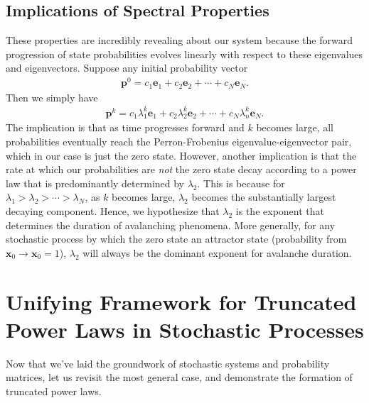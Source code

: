 \documentclass[superscriptaddress]{revtex4-1}
\begin{document}
\subsection{Implications of Spectral Properties}
These properties are incredibly revealing about our system because the forward progression of state probabilities evolves linearly with respect to these eigenvalues and eigenvectors. Suppose any initial probability vector
\begin{align*}
\bm{p}^0 = 
c_1 \bm{e}_1 + c_2 \bm{e}_2 + \dotsm + c_N \bm{e}_N.
\end{align*}
Then we simply have
\begin{align*}
\bm{p}^k = c_1\lambda_1^k\bm{e}_1 + c_2\lambda_2^k\bm{e}_2 + \dotsm + c_N\lambda_n^k\bm{e}_N.
\end{align*}
The implication is that as time progresses forward and $k$ becomes large, all probabilities eventually reach the Perron-Frobenius eigenvalue-eigenvector pair, which in our case is just the zero state. However, another implication is that the rate at which our probabilities are \emph{not} the zero state decay according to a power law that is predominantly determined by $\lambda_2$. This is because for $\lambda_1 > \lambda_2 > \dotsm > \lambda_N$, as $k$ becomes large, $\lambda_2$ becomes the substantially largest decaying component. Hence, we hypothesize that $\lambda_2$ is the exponent that determines the duration of avalanching phenomena. More generally, for any stochastic process by which the zero state an attractor state (probability from $\bm{x}_0 \rightarrow \bm{x}_0 = 1$), $\lambda_2$ will always be the dominant exponent for avalanche duration.
\newpage~\newpage






\section{Unifying Framework for Truncated Power Laws in Stochastic Processes}
Now that we've laid the groundwork of stochastic systems and probability matrices, let us revisit the most general case, and demonstrate the formation of truncated power laws.
\end{document}
